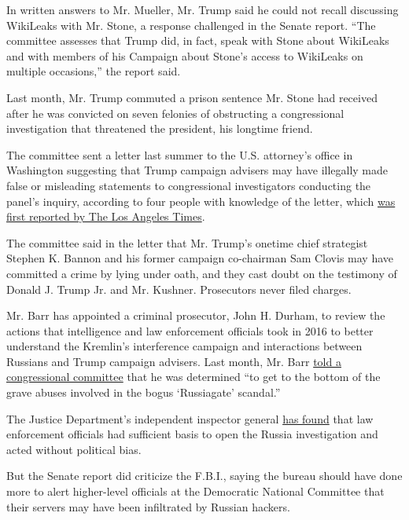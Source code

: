 In written answers to Mr. Mueller, Mr. Trump said he could not recall
discussing WikiLeaks with Mr. Stone, a response challenged in the Senate
report. ``The committee assesses that Trump did, in fact, speak with
Stone about WikiLeaks and with members of his Campaign about Stone's
access to WikiLeaks on multiple occasions,'' the report said.

Last month, Mr. Trump commuted a prison sentence Mr. Stone had received
after he was convicted on seven felonies of obstructing a congressional
investigation that threatened the president, his longtime friend.

The committee sent a letter last summer to the U.S. attorney's office in
Washington suggesting that Trump campaign advisers may have illegally
made false or misleading statements to congressional investigators
conducting the panel's inquiry, according to four people with knowledge
of the letter, which
\href{https://www.latimes.com/politics/story/2020-08-14/senate-committee-sought-investigation-of-bannon-raised-concerns-about-trump-family-testimony}{was
first reported by The Los Angeles Times}.

The committee said in the letter that Mr. Trump's onetime chief
strategist Stephen K. Bannon and his former campaign co-chairman Sam
Clovis may have committed a crime by lying under oath, and they cast
doubt on the testimony of Donald J. Trump Jr. and Mr. Kushner.
Prosecutors never filed charges.

Mr. Barr has appointed a criminal prosecutor, John H. Durham, to review
the actions that intelligence and law enforcement officials took in 2016
to better understand the Kremlin's interference campaign and
interactions between Russians and Trump campaign advisers. Last month,
Mr. Barr
\href{https://www.nytimes3xbfgragh.onion/2020/07/27/us/politics/william-barr-house-judiciary-hearing.html}{told
a congressional committee} that he was determined ``to get to the bottom
of the grave abuses involved in the bogus `Russiagate' scandal.''

The Justice Department's independent inspector general
\href{https://www.nytimes3xbfgragh.onion/2019/12/09/us/politics/fbi-ig-report-russia-investigation.html}{has
found} that law enforcement officials had sufficient basis to open the
Russia investigation and acted without political bias.

But the Senate report did criticize the F.B.I., saying the bureau should
have done more to alert higher-level officials at the Democratic
National Committee that their servers may have been infiltrated by
Russian hackers.

